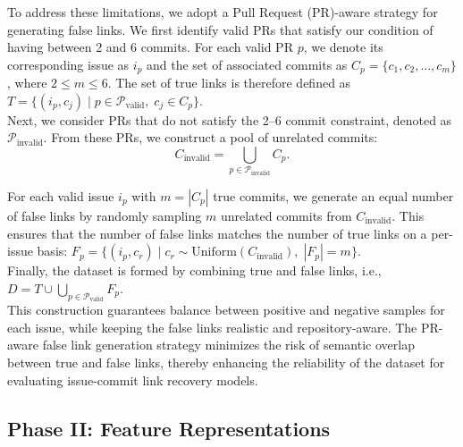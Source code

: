 
To address these limitations, we adopt a Pull Request (PR)-aware strategy for generating false links. We first identify valid PRs that satisfy our condition of having between 2 and 6 commits. For each valid PR $p$, we denote its corresponding issue as $i_p$ and the set of associated commits as $C_p = \{c_1, c_2, \dots, c_m\}$, where $2 \leq m \leq 6$. The set of true links is therefore defined as $T = \{(i_p, c_j) \mid p \in \mathcal{P}_{\text{valid}},\; c_j \in C_p\}$.\\

Next, we consider PRs that do not satisfy the 2--6 commit constraint, denoted as $\mathcal{P}_{\text{invalid}}$. From these PRs, we construct a pool of unrelated commits:
\[
C_{\text{invalid}} = \bigcup_{p \in \mathcal{P}_{\text{invalid}}} C_p.
\]

For each valid issue $i_p$ with $m = |C_p|$ true commits, we generate an equal number of false links by randomly sampling $m$ unrelated commits from $C_{\text{invalid}}$. This ensures that the number of false links matches the number of true links on a per-issue basis: $F_p = \{(i_p, c_r) \mid c_r \sim \text{Uniform}(C_{\text{invalid}}), \; |F_p| = m \}$.\\

\noindent
Finally, the dataset is formed by combining true and false links, i.e., $D = T \cup \bigcup_{p \in \mathcal{P}_{\text{valid}}} F_p$.\\

\noindent
This construction guarantees balance between positive and negative samples for each issue, while keeping the false links realistic and repository-aware. The PR-aware false link generation strategy minimizes the risk of semantic overlap between true and false links, thereby enhancing the reliability of the dataset for evaluating issue-commit link recovery models.


\subsection{Phase II: Feature Representations}

